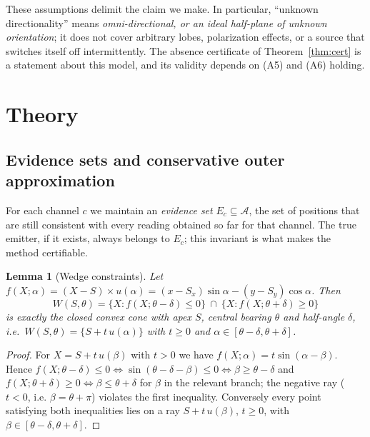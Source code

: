 \documentclass[preprint,12pt,3p]{elsarticle}
\newtheorem{lemma}[theorem]{Lemma}
\theoremstyle{definition}
\newcommand{\bA}{\mathcal{A}}
\begin{document}
\noindent These assumptions delimit the claim we make. In particular, ``unknown
directionality'' means \emph{omni-directional, or an ideal half-plane of unknown orientation}; it does not
cover arbitrary lobes, polarization effects, or a source that switches itself off intermittently.
The absence certificate of Theorem~\ref{thm:cert} is a statement about this model, and its
validity depends on (A5) and (A6) holding.

\section{Theory}
\label{sec:theory}

\subsection{Evidence sets and conservative outer approximation}

For each channel $c$ we maintain an \emph{evidence set} $E_c\subseteq\bA$, the set of positions
that are still consistent with every reading obtained so far for that channel. The true emitter,
if it exists, always belongs to $E_c$; this invariant is what makes the method certifiable.

\begin{lemma}[Wedge constraints]
\label{lem:wedge}
Let $f(X;\alpha)=(X-S)\times u(\alpha)=(x-S_x)\sin\alpha-(y-S_y)\cos\alpha$. Then
\begin{equation}
W(S,\theta)=\{X:f(X;\theta-\delta)\le0\}\ \cap\ \{X:f(X;\theta+\delta)\ge0\}
\label{eq:wedge}
\end{equation}
is exactly the closed convex cone with apex $S$, central bearing $\theta$ and half-angle
$\delta$, i.e.\ $W(S,\theta)=\{S+t\,u(\alpha)\}$ with $t\ge0$ and
$\alpha\in[\theta-\delta,\theta+\delta]$.
\end{lemma}
\begin{proof}
For $X=S+t\,u(\beta)$ with $t>0$ we have $f(X;\alpha)=t\sin(\alpha-\beta)$. Hence
$f(X;\theta-\delta)\le0\iff\sin(\theta-\delta-\beta)\le0\iff\beta\ge\theta-\delta$ and
$f(X;\theta+\delta)\ge0\iff\beta\le\theta+\delta$ for $\beta$ in the relevant branch; the
negative ray ($t<0$, i.e. $\beta=\theta+\pi$) violates the first inequality. Conversely every
point satisfying both inequalities lies on a ray $S+t\,u(\beta)$, $t\ge0$, with
$\beta\in[\theta-\delta,\theta+\delta]$.
\end{proof}
\end{document}
